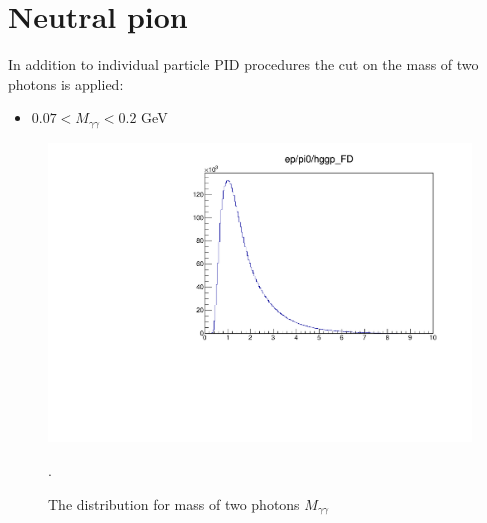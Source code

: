 \section{Neutral pion}
In addition to individual particle PID procedures the cut on the mass of two photons is applied:
\begin{itemize}
	\item $0.07<M_{\gamma\gamma}<0.2$ GeV
\end{itemize}


\begin{figure}[hbt]
	\centering
	\includegraphics[page=6,width=0.6\linewidth]{figures/eppi0.exclusive.pdf}
	
	\caption{The distribution for mass of two photons $M_{\gamma\gamma}$}.
	\label{fig:ggmass}
\end{figure}
